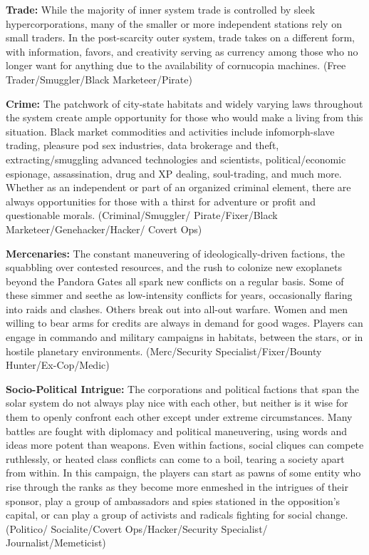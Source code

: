 \textbf{Trade:} While the majority of inner system trade is 
controlled by sleek hypercorporations, many of the 
smaller or more independent stations rely on small 
traders. In the post-scarcity outer system, trade takes 
on a different form, with information, favors, and 
creativity serving as currency among those who no 
longer want for anything due to the availability of 
cornucopia machines. (Free Trader/Smuggler/Black 
Marketeer/Pirate)

\textbf{Crime:} The patchwork of city-state habitats and 
widely varying laws throughout the system create 
ample opportunity for those who would make a 
living from this situation. Black market commodities and activities include infomorph-slave trading, 
pleasure pod sex industries, data brokerage and 
theft, extracting/smuggling advanced technologies 
and scientists, political/economic espionage, assassination, drug and XP dealing, soul-trading, and 
much more. Whether as an independent or part of 
an organized criminal element, there are always opportunities for those with a thirst for adventure or 
profit and questionable morals. (Criminal/Smuggler/
Pirate/Fixer/Black Marketeer/Genehacker/Hacker/
Covert Ops)

\textbf{Mercenaries:} The constant maneuvering of 
ideologically-driven factions, the squabbling over 
contested resources, and the rush to colonize new 
exoplanets beyond the Pandora Gates all spark new 
conflicts on a regular basis. Some of these simmer 
and seethe as low-intensity conflicts for years, occasionally flaring into raids and clashes. Others break 
out into all-out warfare. Women and men willing 
to bear arms for credits are always in demand for 
good wages. Players can engage in commando and 
military campaigns in habitats, between the stars, or 
in hostile planetary environments. (Merc/Security 
Specialist/Fixer/Bounty Hunter/Ex-Cop/Medic)

\textbf{Socio-Political Intrigue:} The corporations and 
political factions that span the solar system do not 
always play nice with each other, but neither is it 
wise for them to openly confront each other except 
under extreme circumstances. Many battles are 
fought with diplomacy and political maneuvering, 
using words and ideas more potent than weapons. 
Even within factions, social cliques can compete 
ruthlessly, or heated class conflicts can come to 
a boil, tearing a society apart from within. In this 
campaign, the players can start as pawns of some 
entity who rise through the ranks as they become 
more enmeshed in the intrigues of their sponsor, play 
a group of ambassadors and spies stationed in the 
opposition's capital, or can play a group of activists and radicals fighting for social change. (Politico/
Socialite/Covert Ops/Hacker/Security Specialist/
Journalist/Memeticist)

